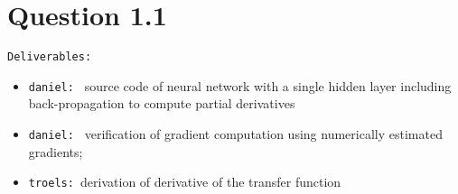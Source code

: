 \section*{Question 1.1}

\texttt{Deliverables:}
\begin{itemize}
	
	\item \texttt{daniel: } source code of neural network with a single hidden layer including back-propagation to compute partial derivatives
	
	\item \texttt{daniel: } verification of gradient computation using numerically estimated gradients;
	
	\item \texttt{troels: }derivation of derivative of the transfer function 
\end{itemize}
